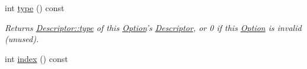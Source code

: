 \begin{DoxyCompactItemize}
\item 
int \hyperlink{classxmem_1_1config_1_1third__party_1_1_option_a4d80ee182577f0dacfbd617cfd714833}{type} () const 
\begin{DoxyCompactList}\small\item\em Returns \hyperlink{structxmem_1_1config_1_1third__party_1_1_descriptor_a4b9e9a5c9b08ef575ea4f603c54bff63}{Descriptor\-::type} of this \hyperlink{classxmem_1_1config_1_1third__party_1_1_option}{Option}'s \hyperlink{structxmem_1_1config_1_1third__party_1_1_descriptor}{Descriptor}, or 0 if this \hyperlink{classxmem_1_1config_1_1third__party_1_1_option}{Option} is invalid (unused). \end{DoxyCompactList}\item 
\hypertarget{classxmem_1_1config_1_1third__party_1_1_option_a7debc43bf253931503da7efd4bf478e9}{int \hyperlink{classxmem_1_1config_1_1third__party_1_1_option_a7debc43bf253931503da7efd4bf478e9}{index} () const }\label{classxmem_1_1config_1_1third__party_1_1_option_a7debc43bf253931503da7efd4bf478e9}


\end{DoxyCompactItemize}
